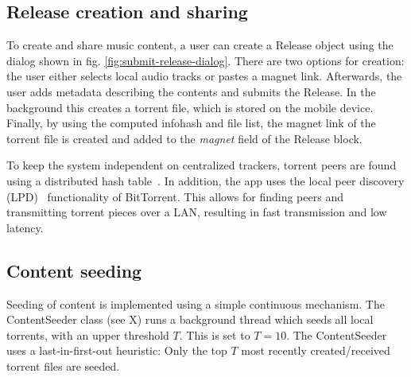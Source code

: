 \subsection{Release creation and sharing}
\label{sec:torrent-creation}
To create and share music content, a user can create a Release object using the dialog shown in fig. \ref{fig:submit-release-dialog}.  There are two options for creation: the user either selects local audio tracks or pastes a magnet link. Afterwards, the user adds metadata describing the contents and submits the Release. In the background this creates a torrent file, which is stored on the mobile device. Finally, by using the computed infohash and file list, the magnet link of the torrent file is created and added to the \textit{magnet} field of the Release block.

To keep the system independent on centralized trackers, torrent peers are found using a distributed hash table~\citep{dht2019}. In addition, the app uses the local peer discovery (LPD)~\citep{bittorrentbep142015} functionality of BitTorrent. This allows for finding peers and transmitting torrent pieces over a LAN, resulting in fast transmission and low latency.
\subsection{Content seeding}
\label{sec:content-seeding}
Seeding of content is implemented using a simple continuous mechanism. The ContentSeeder class (see X) runs a background thread which seeds all local torrents, with an upper threshold \(T\). This is set to \(T=10\). The ContentSeeder uses a last-in-first-out heuristic: Only the top \(T\) most recently created/received torrent files are seeded.
